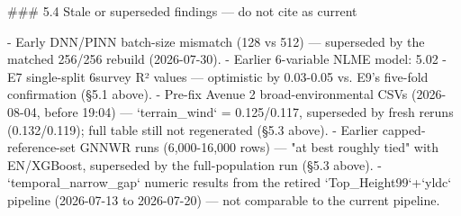 ### 5.4 Stale or superseded findings — do not cite as current

- Early DNN/PINN batch-size mismatch (128 vs 512) — superseded by the matched 256/256 rebuild (2026-07-30).
- Earlier 6-variable NLME model: 5.02%
- E7 single-split 6survey R² values — optimistic by 0.03-0.05 vs. E9's five-fold confirmation (§5.1 above).
- Pre-fix Avenue 2 broad-environmental CSVs (2026-08-04, before 19:04) — `terrain_wind` = 0.125/0.117, superseded by fresh reruns (0.132/0.119); full table still not regenerated (§5.3 above).
- Earlier capped-reference-set GNNWR runs (6,000-16,000 rows) — "at best roughly tied" with EN/XGBoost, superseded by the full-population run (§5.3 above).
- `temporal_narrow_gap` numeric results from the retired `Top_Height99`+`yldc` pipeline (2026-07-13 to 2026-07-20) — not comparable to the current pipeline.
